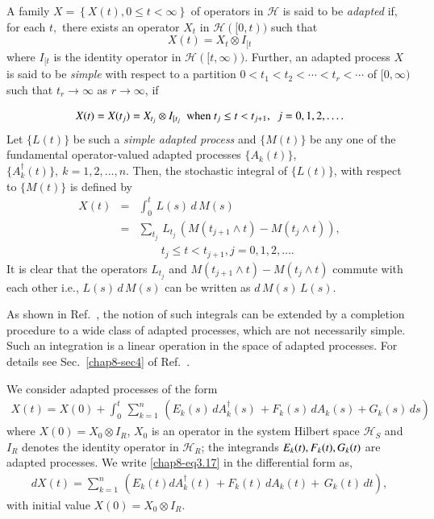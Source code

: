 A family $X = \left \{ X(t), 0 \leq t < \infty \right \}$ of operators in  $\mathcal{H}$ is said to be {\it adapted} if, for each $t,$ there exists an operator $X_t$ in $\mathcal{H}([0,t))$ such that 
$$
X(t) = X_t \otimes I_{[t}
$$ 
where $I_{[t}$ is the identity operator in $\mathcal{H}([t,\infty)).$  Further, an adapted process $X$ is said to be {\it simple} with respect to a partition $0 < t_1 < t_2 < \cdots < t_r < \cdots $ of $[0, \infty)$ such that $t_r \rightarrow \infty$ as $r \rightarrow \infty$, if 

{\fontsize{9}{11}\selectfont
\begin{equation}
X(t)=X({t_j})=X_{t_j} \otimes I_{[t_j} \ \  {\rm when}\ t_j\leq t<t_{j+1},\ \ j=0,1,2,\ldots .  \label{chap8-eq15}
\end{equation}}
Let $\{L(t)\}$ be such a {\it simple adapted process} and $\{M(t)\}$ be any one of the fundamental operator-valued adapted processes $\{A_k(t)\}$, $\{A_k^\dag(t)\},\ k=1,2,\ldots, n$. Then,  the stochastic integral of   $\{L(t)\}$, with respect to  $\{M(t)\}$  is defined by  
\begin{eqnarray}
		X(t)&=&\int_{0}^t\,  L(s)\, d\, M(s)  \nonumber \\
		&=&\sum_{t_j}\, L_{t_j}\, \left( M (t_{j+1} \wedge t)- M (t_{j} \wedge t)\right),\nonumber \\ 
		&&\qquad t_j\leq t<t_{j+1},  j=0,1,2,\ldots. \label{chap8-eq3.16} 
\end{eqnarray}
It is clear that the operators $L_{t_j}$ and  $M (t_{j+1} \wedge t)- M (t_{j} \wedge t)$ commute with each other i.e., $ L(s)\, d\, M(s)$ can be written as $d\, M(s)\, L(s).$ 

As shown in Ref.~\cite{chap8-key7}, the notion of such integrals can be extended by a completion procedure to a wide class of adapted processes, which are not necessarily simple. Such an integration is a linear operation in the space of adapted processes.  For details see Sec.\ \ref{chap8-sec4} of Ref.~\cite{chap8-key7}. 

We consider adapted processes of the form  
\begin{eqnarray}
		X(t)=X(0)+ \int_0^t\, \sum_{k=1}^n\, \left(E_{k}(s)\, dA^\dag_k(s)\, + F_{k}(s)\, dA_k(s)+ G_{k}(s)\, ds\right)  \label{chap8-eq3.17}
\end{eqnarray}    
where $X(0)=X_0\otimes I_R$,  $X_0$ is an operator in the system Hilbert space $\mathcal{H}_S$ and $I_R$ denotes the identity operator in $\mathcal{H}_R$; the integrands $E_k(t), F_k(t),\break G_k(t)$ are adapted processes. 
We write \eqref{chap8-eq3.17}  in the differential form as, 
\begin{eqnarray}
		dX(t)=\sum_{k=1}^n\, \left( E_{k}(t) dA^\dag_k(t)\, + F_{k}(t)\, dA_k(t)+\,  G_{k}(t)\, dt\right),  \label{chap8-eq3.18}
\end{eqnarray}    
with initial value $X(0)=X_0\otimes I_R$. 


